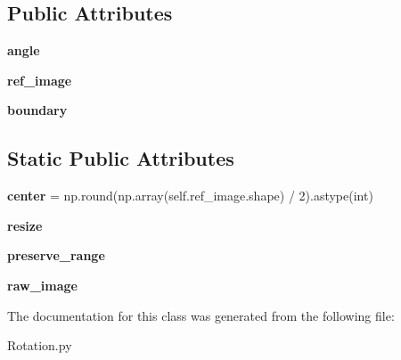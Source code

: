 \subsection*{Public Attributes}
\begin{DoxyCompactItemize}
\item 
\mbox{\label{class_rotation_1_1_rotation_a2b769af2d16a19c15ff061741f543427}} 
{\bfseries angle}
\item 
\mbox{\label{class_rotation_1_1_rotation_a3a589876d620cc81e8a0f50be72ec719}} 
{\bfseries ref\+\_\+image}
\item 
\mbox{\label{class_rotation_1_1_rotation_a6512ff6c3f073bbeb5e1791976e04c9d}} 
{\bfseries boundary}
\end{DoxyCompactItemize}
\subsection*{Static Public Attributes}
\begin{DoxyCompactItemize}
\item 
\mbox{\label{class_rotation_1_1_rotation_aed3797105dbc28d689f419edd87adae2}} 
{\bfseries center} = np.\+round(np.\+array(self.\+ref\+\_\+image.\+shape) / 2).astype(int)
\item 
\mbox{\label{class_rotation_1_1_rotation_a05352e7eaac0befb7d0ec1ad17992bc3}} 
{\bfseries resize}
\item 
\mbox{\label{class_rotation_1_1_rotation_aea382d9fac06d80641f9777327ea0b0b}} 
{\bfseries preserve\+\_\+range}
\item 
\mbox{\label{class_rotation_1_1_rotation_a8b83734d4f1bfde2ebd87535f87afa58}} 
{\bfseries raw\+\_\+image}
\end{DoxyCompactItemize}


The documentation for this class was generated from the following file\+:\begin{DoxyCompactItemize}
\item 
Rotation.\+py\end{DoxyCompactItemize}
